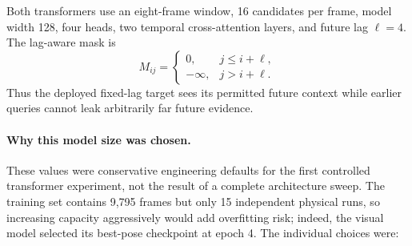\documentclass[11pt]{article}
\begin{document}
Both transformers use an eight-frame window, 16 candidates per frame, model width 128, four heads, two temporal cross-attention layers, and future lag $\ell=4$.  The lag-aware mask is
\begin{equation}
M_{ij}=\begin{cases}0,&j\le i+\ell,\\-\infty,&j>i+\ell.\end{cases}
\end{equation}
Thus the deployed fixed-lag target sees its permitted future context while earlier queries cannot leak arbitrarily far future evidence.

\paragraph{Why this model size was chosen.}
These values were conservative engineering defaults for the first controlled transformer experiment, not the result of a complete architecture sweep.  The training set contains 9,795 frames but only 15 independent physical runs, so increasing capacity aggressively would add overfitting risk; indeed, the visual model selected its best-pose checkpoint at epoch 4.  The individual choices were:
\end{document}
